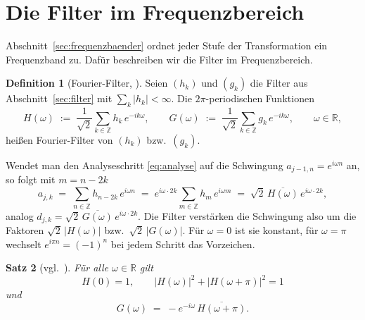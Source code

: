 \documentclass[a4paper,11pt,bibliography=totoc,listof=totoc,headinclude=true,cleardoublepage=empty,oneside]{scrbook}
\theoremstyle{plain}
\newtheorem{Satz}{Satz}[chapter]
\theoremstyle{definition}
\newtheorem{Definition}[Satz]{Definition}
\newcommand{\R}{\mathbb{R}}
\newcommand{\Z}{\mathbb{Z}}
\begin{document}
\section{Die Filter im Frequenzbereich}
\label{sec:fourier-bedingungen}

Abschnitt~\ref{sec:frequenzbaender} ordnet jeder Stufe der Transformation ein
Frequenzband zu. Dafür beschreiben wir die Filter im Frequenzbereich.

\begin{Definition}[Fourier-Filter, {\cite[Gl.~(2.2.24)]{lmr}}] %
\label{def:fourier-filter}
Seien $(h_k)$ und $(g_k)$ die Filter aus Abschnitt~\ref{sec:filter} mit
$\sum_k\lvert h_k\rvert<\infty$. Die $2\pi$-periodischen Funktionen
\begin{equation}
\label{eq:symbol-H}
  H(\omega) \;:=\; \frac{1}{\sqrt2}\sum_{k\in\Z} h_k\,e^{-ik\omega},
  \qquad
  G(\omega) \;:=\; \frac{1}{\sqrt2}\sum_{k\in\Z} g_k\,e^{-ik\omega},
  \qquad \omega\in\R,
\end{equation}
hei\ss{}en Fourier-Filter von $(h_k)$ bzw.\ $(g_k)$.
\end{Definition}

Wendet man den Analyseschritt \eqref{eq:analyse} auf die Schwingung
$a_{j-1,n} = e^{i\omega n}$ an, so folgt mit $m = n-2k$
\[
  a_{j,k} \;=\; \sum_{n\in\Z} h_{n-2k}\,e^{i\omega n}
  \;=\; e^{i\omega\cdot 2k}\sum_{m\in\Z} h_m\,e^{i\omega m}
  \;=\; \sqrt2\,\overline{H(\omega)}\,e^{i\omega\cdot 2k} ,
\]
analog $d_{j,k} = \sqrt2\,\overline{G(\omega)}\,e^{i\omega\cdot 2k}$. Die
Filter verstärken die Schwingung also um die Faktoren
$\sqrt2\,\lvert H(\omega)\rvert$ bzw.\ $\sqrt2\,\lvert G(\omega)\rvert$. Für
$\omega = 0$ ist sie konstant, für $\omega = \pi$ wechselt
$e^{i\pi n} = (-1)^n$ bei jedem Schritt das Vorzeichen.

\begin{Satz}[vgl.\ {\cite[Satz~2.2.9, Korollar~2.2.12]{lmr}}] %
\label{satz:qmf}
Für alle $\omega\in\R$ gilt
\begin{equation}
\label{eq:qmf}
  H(0) = 1, \qquad
  \lvert H(\omega)\rvert^2 + \lvert H(\omega+\pi)\rvert^2 = 1
\end{equation}
und
\begin{equation}
\label{eq:G-aus-H}
  G(\omega) \;=\; -e^{-i\omega}\,\overline{H(\omega+\pi)} .
\end{equation}
\end{Satz}
\end{document}
